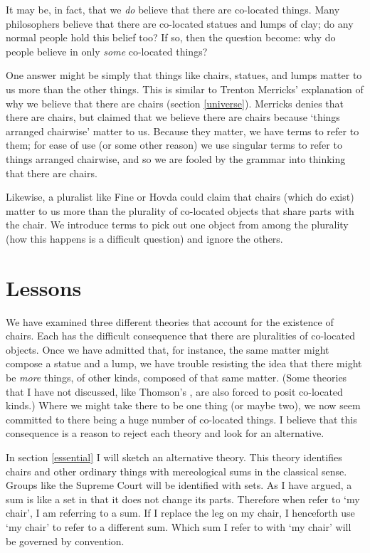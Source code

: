 \documentclass[11pt]{article}
\begin{document}
\begin{spacing}{1.5}
It may be, in fact, that we {\em do} believe that there are co-located
things.  Many philosophers believe that there are co-located statues
and lumps of clay; do any normal people hold this belief too?
If so, then the question become: why do people believe in only {\em
  some} co-located things?

One answer might be simply that things like chairs, statues, and lumps
matter to us more than the other things.  This is similar to Trenton
Merricks' explanation of why we believe that there are chairs (section
\ref{universe}).  Merricks denies that there are chairs, but claimed
that we believe there are chairs because `things arranged chairwise'
matter to us.  Because they matter, we have terms to refer to them;
for ease of use (or some other reason) we use singular terms to refer
to things arranged chairwise, and so we are fooled by the grammar into
thinking that there are chairs.

Likewise, a pluralist like Fine or Hovda could claim that chairs
(which do exist) matter to us more than the plurality of co-located
objects that share parts with the chair.  We introduce terms to pick
out one object from among the plurality (how this happens is a
difficult question) and ignore the others.

\section{Lessons}
\label{lessons-p}
We have examined three different theories that account for the
existence of chairs.  Each has the difficult consequence that there
are pluralities of co-located objects.  Once we have admitted that,
for instance, the same matter might compose a statue and a lump, we
have trouble resisting the idea that there might be {\em more} things,
of other kinds, composed of that same matter.  (Some theories that I
have not discussed, like Thomson's \citeyearpar{thomson1998a}, are
also forced to posit co-located kinds.)  Where we might take there to
be one thing (or maybe two), we now seem committed to there being a
huge number of co-located things.  I believe that this consequence is
a reason to reject each theory and look for an alternative.

In section \ref{essential} I will sketch an alternative theory.  This
theory identifies chairs and other ordinary things with mereological
sums in the classical sense.  Groups like the Supreme Court will be
identified with sets.  As I have argued, a sum is like a set in that
it does not change its parts.  Therefore when refer to `my chair', I
am referring to a sum.  If I replace the leg on my chair, I henceforth
use `my chair' to refer to a different sum.  Which sum I refer to with
`my chair' will be governed by convention.

\ifstandalone
\end{spacing}


\fi
\end{document}
